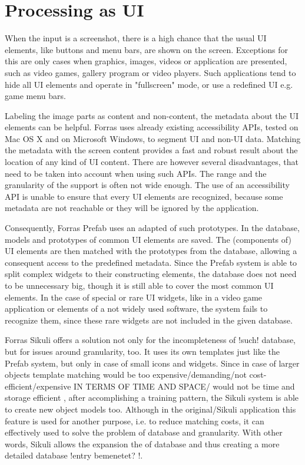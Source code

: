 \documentclass[draft,final]{vutinfth} %
\begin{document}
	\section{Processing as UI}
	When the input is a screenshot, there is a high chance that the usual UI elements, like buttons and menu bars, are shown on the screen.
	Exceptions for this are only cases when graphics, images, videos or application are presented, such as video games, gallery program or video players.
	Such applications tend to hide all UI elements and operate in "fullscreen" mode, or use a redefined UI e.g. game menu bars.\par
	Labeling the image parts as content and non-content, the metadata about the UI elements can be helpful.
	Forras uses already existing accessibility APIs, tested on Mac OS X and on Microsoft Windows, to segment UI and non-UI data. 
	Matching the metadata with the screen content provides a fast and robust result about the location of any kind of UI content.
	There are however several disadvantages, that need to be taken into account when using such APIs.
	The range and the granularity of the support is often not wide enough.
	The use of an accessibility API is unable to ensure that every UI elements are recognized, because some metadata are not reachable or they will be ignored by the application.\par
	Consequently, Forras Prefab uses an adapted of such prototypes. 
	In the database, models and  prototypes of common UI elements are saved.
	The (components of) UI elements are then matched with the prototypes from the database, allowing a consequent access to the predefined metadata.
	Since the Prefab system is able to split complex widgets to their constructing elements, the database does not need to be unnecessary big, though it is still able to cover the most common UI elements.
	In the case of special or rare UI widgets, like in a video game application or elements of a not widely used software, the system fails to recognize them, since these rare widgets are not included in the given database.\par
	Forras Sikuli offers a solution not only for the incompleteness of !such! database, but for issues around granularity, too.
	It uses its own templates just like the Prefab system, but only in case of small icons and widgets.
	Since in case of larger objects template matching would be too expensive/demanding/not cost-efficient/expensive IN TERMS OF TIME AND SPACE/ would not be time and storage efficient , after accomplishing a training pattern, the Sikuli system is able to create new object models too.
	Although in the original/Sikuli application this feature is used for another purpose, i.e. to reduce matching costs, it can effectively used to solve the problem of database and granularity.
	With other words, Sikuli allows the expansion the of database and thus creating a more detailed database !entry bemenetet? !.\par
	
\end{document}
